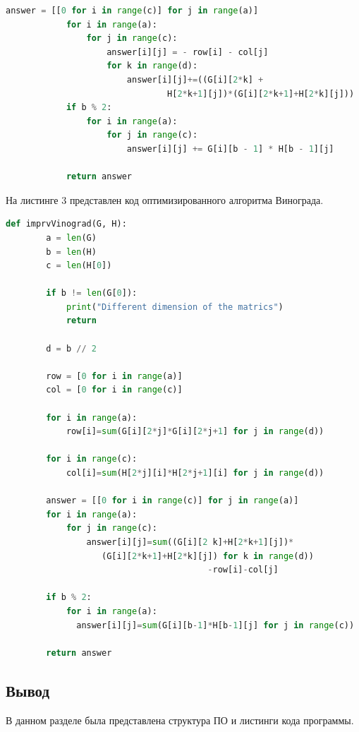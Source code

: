 \documentclass[a4paper, 12pt]{article}
\begin{document}
\begin{flushleft}
\begin{lstlisting}[language=Python, caption = Алгоритм Винограда]
			answer = [[0 for i in range(c)] for j in range(a)]
			for i in range(a):
				for j in range(c):
					answer[i][j] = - row[i] - col[j]
					for k in range(d):
						answer[i][j]+=((G[i][2*k] + 
								H[2*k+1][j])*(G[i][2*k+1]+H[2*k][j]))
			if b % 2:
				for i in range(a):
					for j in range(c):
						answer[i][j] += G[i][b - 1] * H[b - 1][j]
		
			return answer
	\end{lstlisting}
	\clearpage
	\newpage
	\hspace*{5mm} На листинге 3 представлен код оптимизированного алгоритма Винограда.
	\begin{lstlisting}[language=Python, caption = Оптимизированный алгоритм Винограда]
		def imprvVinograd(G, H):
		a = len(G)
		b = len(H)
		c = len(H[0])
		
		if b != len(G[0]):
			print("Different dimension of the matrics")
			return
		
		d = b // 2
		
		row = [0 for i in range(a)]
		col = [0 for i in range(c)]
		
		for i in range(a):
			row[i]=sum(G[i][2*j]*G[i][2*j+1] for j in range(d))
		
		for i in range(c):
			col[i]=sum(H[2*j][i]*H[2*j+1][i] for j in range(d))
		
		answer = [[0 for i in range(c)] for j in range(a)]
		for i in range(a):
			for j in range(c):
				answer[i][j]=sum((G[i][2 k]+H[2*k+1][j])*
				   (G[i][2*k+1]+H[2*k][j]) for k in range(d))
				   						-row[i]-col[j]
	
		if b % 2:
			for i in range(a):
			  answer[i][j]=sum(G[i][b-1]*H[b-1][j] for j in range(c))
	
		return answer
	\end{lstlisting}
	\subsection{Вывод}
	\hspace*{5mm} В данном разделе была представлена структура ПО и листинги кода программы. 
	
\end{flushleft}

\newpage
\end{document}
